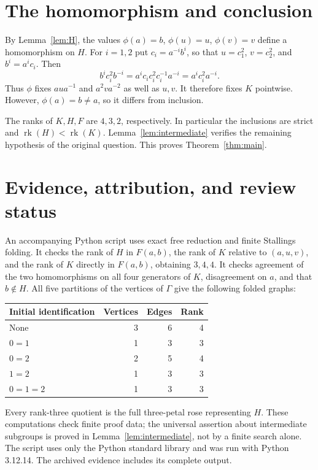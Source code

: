\documentclass[11pt,a4paper]{article}
\newcommand{\rk}{\operatorname{rk}}
\begin{document}
\section{The homomorphism and conclusion}
By Lemma~\ref{lem:H}, the values $\phi(a)=b$, $\phi(u)=u$, $\phi(v)=v$ define a homomorphism on $H$. For $i=1,2$ put $c_i=a^{-i}b^i$, so that $u=c_1^2$, $v=c_2^2$, and $b^i=a^ic_i$. Then
\[
b^ic_i^2b^{-i}
=a^ic_i c_i^2 c_i^{-1}a^{-i}
=a^ic_i^2a^{-i}.
\]
Thus $\phi$ fixes $aua^{-1}$ and $a^2va^{-2}$ as well as $u,v$. It therefore fixes $K$ pointwise. However, $\phi(a)=b\ne a$, so it differs from inclusion.

The ranks of $K,H,F$ are $4,3,2$, respectively. In particular the inclusions are strict and $\rk(H)<\rk(K)$. Lemma~\ref{lem:intermediate} verifies the remaining hypothesis of the original question. This proves Theorem~\ref{thm:main}.

\section{Evidence, attribution, and review status}
An accompanying Python script uses exact free reduction and finite Stallings folding. It checks the rank of $H$ in $F(a,b)$, the rank of $K$ relative to $(a,u,v)$, and the rank of $K$ directly in $F(a,b)$, obtaining $3,4,4$. It checks agreement of the two homomorphisms on all four generators of $K$, disagreement on $a$, and that $b\notin H$. All five partitions of the vertices of $\Gamma$ give the following folded graphs:
\begin{center}
\begin{tabular}{lrrr}
\toprule
Initial identification & Vertices & Edges & Rank\\
\midrule
None & 3 & 6 & 4\\
$0=1$ & 1 & 3 & 3\\
$0=2$ & 2 & 5 & 4\\
$1=2$ & 1 & 3 & 3\\
$0=1=2$ & 1 & 3 & 3\\
\bottomrule
\end{tabular}
\end{center}
Every rank-three quotient is the full three-petal rose representing $H$. These computations check finite proof data; the universal assertion about intermediate subgroups is proved in Lemma~\ref{lem:intermediate}, not by a finite search alone. The script uses only the Python standard library and was run with Python 3.12.14. The archived evidence includes its complete output.
\end{document}
